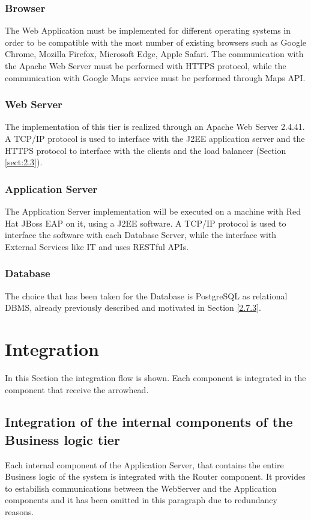 \documentclass[../DD.tex]{subfiles}
\begin{document}
\subsubsection{Browser}
The Web Application must be implemented for different operating systems in order to be compatible with the most number of existing browsers such as Google Chrome, Mozilla Firefox, Microsoft Edge, Apple Safari. The communication with the Apache Web Server must be performed with HTTPS protocol, while the communication with Google Maps service must be performed through Maps API.

\subsubsection{Web Server}
The implementation of this tier is realized through an Apache Web Server 2.4.41. A TCP/IP protocol is used to interface with the J2EE application server and the HTTPS protocol to interface with the clients and the load balancer (Section \ref{sect:2.3}). 

\subsubsection{Application Server}
The Application Server implementation will be executed on a machine with Red Hat JBoss EAP on it, using a J2EE software. A TCP/IP protocol is used to interface the software with each Database Server, while the interface with External Services like  IT and  uses RESTful APIs.

\subsubsection{Database}
The choice that has been taken for the Database is PostgreSQL as relational DBMS, already previously described and motivated in Section \ref{2.7.3}.

\section{Integration\label{5.3}}

In this Section the integration flow is shown. Each component is integrated in the component that receive the arrowhead.

\subsection{Integration of the internal components of the Business logic tier}
Each internal component of the Application Server, that contains the entire Business logic of the system is integrated with the Router component. It provides to estabilish communications between the WebServer and the Application components and it has been omitted in this paragraph due to redundancy reasons.
\end{document}
